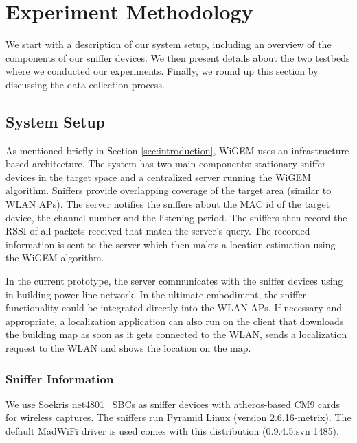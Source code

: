 \section{Experiment Methodology}
\label{sec:experimentmethodology}

We start with a description of our system setup, including an overview of the components of our sniffer devices. We then present details about the two testbeds where we conducted our experiments. Finally, we round up this section by discussing the data collection process.

\subsection{System Setup}
\label{subsec:systemsetup}

As mentioned briefly in Section \ref{sec:introduction}, WiGEM uses an infrastructure based
architecture. The system has two main components: stationary sniffer devices in the target space and a centralized server running the WiGEM algorithm. Sniffers provide overlapping coverage of the target area (similar to WLAN APs). The server notifies the sniffers about the MAC id of the target device, the channel number and the listening period. The sniffers then record the RSSI of all packets received that match the server's query. The recorded information is sent to the server which then makes a location estimation using the WiGEM algorithm.

In the current prototype, the server communicates with the sniffer devices using in-building power-line network. In the ultimate embodiment, the sniffer functionality could be integrated directly into the WLAN APs. If necessary and appropriate, a localization application can also run on the client that downloads the building map as soon as it gets connected to the WLAN, sends a localization request to the WLAN and shows the location on the map. 

\subsubsection{Sniffer Information}
\label{subsec:snifferinformation}


We use Soekris net4801~\cite{soekris}  SBCs as sniffer
devices with atheros-based CM9 cards for wireless captures. The sniffers run Pyramid Linux (version 2.6.16-metrix). The default
MadWiFi driver is used comes with this distribution (0.9.4.5:svn 1485). 

